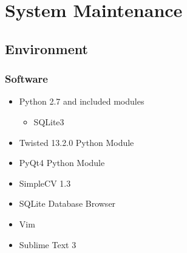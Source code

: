 \documentclass[12pt,a4paper]{report}
\begin{document}
\chapter{System Maintenance}

\section{Environment}
    \label{sec:env}
    \subsection{Software}
    \begin{itemize}
        \item Python 2.7 and included modules
        
        \begin{itemize}
            \item SQLite3
        \end{itemize}
        
        \item Twisted 13.2.0 Python Module
        \item PyQt4 Python Module
        \item SimpleCV 1.3
        \item SQLite Database Browser
        \item Vim
        \item Sublime Text 3
    \end{itemize}
\end{document}
